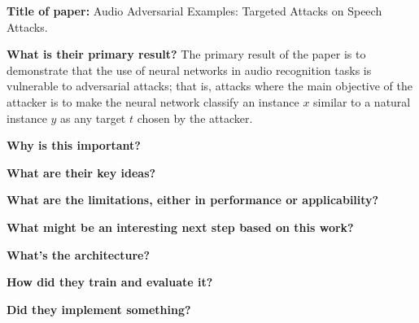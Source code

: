 \noindent \textbf{\large Title of paper:} Audio Adversarial Examples: Targeted
Attacks on Speech Attacks.

\noindent\textbf{\large What is their primary result?} The primary result of the
paper is to demonstrate that the use of neural networks in audio recognition
tasks is vulnerable to adversarial attacks; that is, attacks where the main
objective of the attacker is to make the neural network classify an instance $x$
similar to a natural instance $y$ as any target $t$ chosen by the attacker.

\noindent\textbf{\large Why is this important?}

\noindent\textbf{\large What are their key ideas?}

\noindent\textbf{\large What are the limitations, either in performance or applicability?}

\noindent\textbf{\large What might be an interesting next step based on this work?}

\noindent\textbf{\large What's the architecture?}

\noindent\textbf{\large How did they train and evaluate it?}

\noindent\textbf{\large Did they implement something?}











